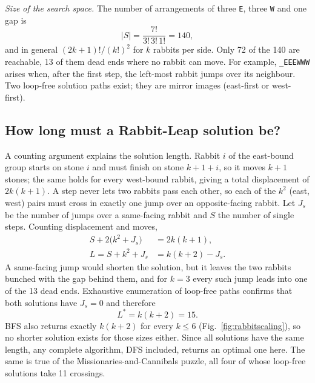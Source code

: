 \documentclass[journal]{IEEEtran}
\newcommand{\st}[1]{\texttt{#1}}
\begin{document}
\emph{Size of the search space.} The number of arrangements of three \st{E}, three \st{W}
and one gap is
\begin{equation}
|S| = \frac{7!}{3!\,3!\,1!} = 140,
\end{equation}
and in general $(2k+1)!/(k!)^2$ for $k$ rabbits per side. Only 72 of the 140 are reachable,
13 of them dead ends where no rabbit can move. For example, \st{\_EEEWWW} arises when,
after the first step, the left-most rabbit jumps over its neighbour. Two loop-free solution paths exist; they are mirror images (east-first or
west-first).

\subsection{How long must a Rabbit-Leap solution be?}
A counting argument explains the solution length. Rabbit $i$ of the east-bound group starts on
stone $i$ and must finish on stone $k+1+i$, so it moves $k+1$ stones; the same holds for every
west-bound rabbit, giving a total displacement of $2k(k+1)$. A step never lets two rabbits pass
each other, so each of the $k^2$ (east, west) pairs must cross in exactly one jump over an
opposite-facing rabbit. Let $J_s$ be the number of jumps over a same-facing rabbit and $S$ the
number of single steps. Counting displacement and moves,
\begin{align}
S + 2\bigl(k^2 + J_s\bigr) &= 2k(k+1), \\
L = S + k^2 + J_s &= k(k+2) - J_s .
\end{align}
A same-facing jump would shorten the solution, but it leaves the two rabbits bunched with the
gap behind them, and for $k=3$ every such jump leads into one of the 13 dead ends. Exhaustive
enumeration of loop-free paths confirms that both solutions have $J_s=0$ and therefore
\begin{equation}
L^* = k(k+2) = 15 .
\end{equation}
BFS also returns exactly $k(k+2)$ for every $k\le6$ (Fig.~\ref{fig:rabbitscaling}), so no
shorter solution exists for those sizes either. Since all solutions have the same length, any
complete algorithm, DFS included, returns an optimal one here. The same is true of the
Missionaries-and-Cannibals puzzle, all four of whose loop-free solutions take 11 crossings.
\end{document}
